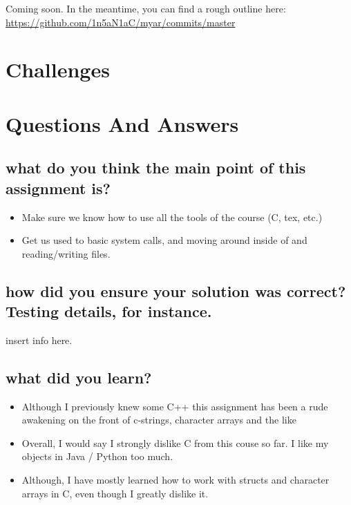 \documentclass[letterpaper,10pt,titlepage]{article}
\begin{document}
Coming soon.  In the meantime, you can find a rough outline here:
\url{https://github.com/1n5aN1aC/myar/commits/master}

\section{Challenges}

\section{Questions And Answers}

\subsection{what do you think the main point of this assignment is?}

\begin{itemize}
\item Make sure we know how to use all the tools of the course (C, tex, etc.)
\item Get us used to basic system calls, and moving around inside of and reading/writing files.
\end{itemize}

\subsection{how did you ensure your solution was correct? Testing details, for instance.}

insert info here.

\subsection{what did you learn?}

\begin{itemize}
\item Although I previously knew some C++ this assignment has been a rude awakening on the front of c-strings, character arrays and the like
\item Overall, I would say I strongly dislike C from this couse so far.  I like my objects in Java / Python too much.
\item Although, I have mostly learned how to work with structs and character arrays in C, even though I greatly dislike it.
\end{itemize}
\end{document}
